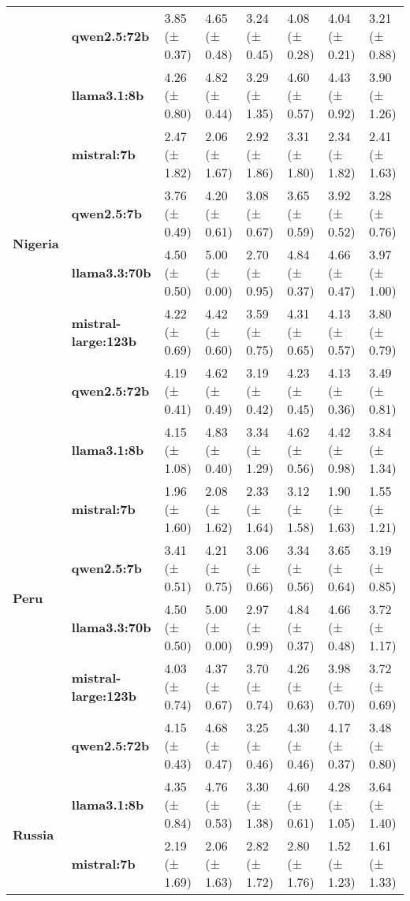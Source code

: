 \begin{longtable}{llllllll}
\textbf{} & \textbf{qwen2.5:72b} & 3.85 (± 0.37) & 4.65 (± 0.48) & 3.24 (± 0.45) & 4.08 (± 0.28) & 4.04 (± 0.21) & 3.21 (± 0.88) \\
\cline{1-8}
\multirow[t]{6}{*}{\textbf{Nigeria}} & \textbf{llama3.1:8b} & 4.26 (± 0.80) & 4.82 (± 0.44) & 3.29 (± 1.35) & 4.60 (± 0.57) & 4.43 (± 0.92) & 3.90 (± 1.26) \\
\textbf{} & \textbf{mistral:7b} & 2.47 (± 1.82) & 2.06 (± 1.67) & 2.92 (± 1.86) & 3.31 (± 1.80) & 2.34 (± 1.82) & 2.41 (± 1.63) \\
\textbf{} & \textbf{qwen2.5:7b} & 3.76 (± 0.49) & 4.20 (± 0.61) & 3.08 (± 0.67) & 3.65 (± 0.59) & 3.92 (± 0.52) & 3.28 (± 0.76) \\
\textbf{} & \textbf{llama3.3:70b} & 4.50 (± 0.50) & 5.00 (± 0.00) & 2.70 (± 0.95) & 4.84 (± 0.37) & 4.66 (± 0.47) & 3.97 (± 1.00) \\
\textbf{} & \textbf{mistral-large:123b} & 4.22 (± 0.69) & 4.42 (± 0.60) & 3.59 (± 0.75) & 4.31 (± 0.65) & 4.13 (± 0.57) & 3.80 (± 0.79) \\
\textbf{} & \textbf{qwen2.5:72b} & 4.19 (± 0.41) & 4.62 (± 0.49) & 3.19 (± 0.42) & 4.23 (± 0.45) & 4.13 (± 0.36) & 3.49 (± 0.81) \\
\cline{1-8}
\multirow[t]{6}{*}{\textbf{Peru}} & \textbf{llama3.1:8b} & 4.15 (± 1.08) & 4.83 (± 0.40) & 3.34 (± 1.29) & 4.62 (± 0.56) & 4.42 (± 0.98) & 3.84 (± 1.34) \\
\textbf{} & \textbf{mistral:7b} & 1.96 (± 1.60) & 2.08 (± 1.62) & 2.33 (± 1.64) & 3.12 (± 1.58) & 1.90 (± 1.63) & 1.55 (± 1.21) \\
\textbf{} & \textbf{qwen2.5:7b} & 3.41 (± 0.51) & 4.21 (± 0.75) & 3.06 (± 0.66) & 3.34 (± 0.56) & 3.65 (± 0.64) & 3.19 (± 0.85) \\
\textbf{} & \textbf{llama3.3:70b} & 4.50 (± 0.50) & 5.00 (± 0.00) & 2.97 (± 0.99) & 4.84 (± 0.37) & 4.66 (± 0.48) & 3.72 (± 1.17) \\
\textbf{} & \textbf{mistral-large:123b} & 4.03 (± 0.74) & 4.37 (± 0.67) & 3.70 (± 0.74) & 4.26 (± 0.63) & 3.98 (± 0.70) & 3.72 (± 0.69) \\
\textbf{} & \textbf{qwen2.5:72b} & 4.15 (± 0.43) & 4.68 (± 0.47) & 3.25 (± 0.46) & 4.30 (± 0.46) & 4.17 (± 0.37) & 3.48 (± 0.80) \\
\cline{1-8}
\multirow[t]{6}{*}{\textbf{Russia}} & \textbf{llama3.1:8b} & 4.35 (± 0.84) & 4.76 (± 0.53) & 3.30 (± 1.38) & 4.60 (± 0.61) & 4.28 (± 1.05) & 3.64 (± 1.40) \\
\textbf{} & \textbf{mistral:7b} & 2.19 (± 1.69) & 2.06 (± 1.63) & 2.82 (± 1.72) & 2.80 (± 1.76) & 1.52 (± 1.23) & 1.61 (± 1.33) \\

\end{longtable}
